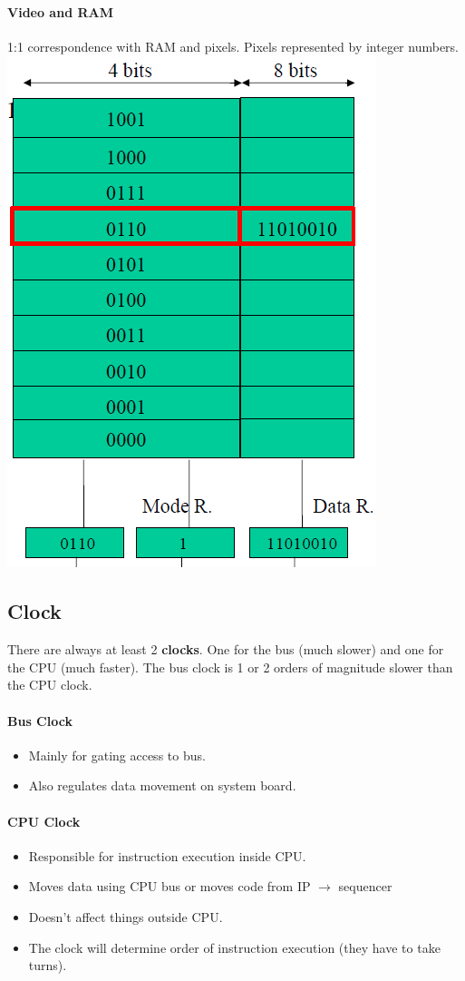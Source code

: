 \documentclass[12 pt]{article}
\begin{document}
	\paragraph{Video and RAM}
	1:1 correspondence with RAM and pixels. Pixels represented by integer numbers. 
	\includegraphics[scale=0.3]{rrr.png}
	\subsection{Clock}
	There are always at least 2 \textbf{clocks}. One for the bus (much slower) and one for the CPU (much faster). The bus clock is 1 or 2 orders of magnitude slower than the CPU clock.
	\paragraph{Bus Clock}
	\begin{itemize}
		\item Mainly for gating access to bus.
		\item Also regulates data movement on system board.
	\end{itemize}
	\paragraph{CPU Clock}
	\begin{itemize}
		\item Responsible for instruction execution inside CPU.
		\item Moves data using CPU bus or moves code from IP $\to$ sequencer
		\item Doesn't affect things outside CPU.
		\item The clock will determine order of instruction execution (they have to take turns).
	\end{itemize}
\end{document}
